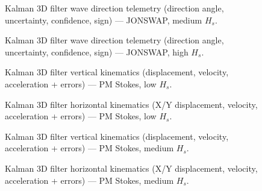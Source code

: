 \documentclass[11pt,letterpaper]{article}
\begin{document}
    \begin{figure}[H]\centering
    \resizebox{\textwidth}{!}{}
    \caption{Kalman 3D filter wave direction telemetry (direction angle, uncertainty, confidence, sign) — JONSWAP, medium $H_s$.}
    \label{fig:w3d_ou2_jonswap_medium_dir}
    \end{figure}

    \begin{figure}[H]\centering
    \resizebox{\textwidth}{!}{}
    \caption{Kalman 3D filter wave direction telemetry (direction angle, uncertainty, confidence, sign) — JONSWAP, high $H_s$.}
    \label{fig:w3d_ou2_jonswap_high_dir}
    \end{figure}




    \begin{figure}[H]\centering
    \resizebox{\textwidth}{!}{}
    \caption{Kalman 3D filter vertical kinematics (displacement, velocity, acceleration + errors) — PM Stokes, low $H_s$.}
    \label{fig:w3d_ou2_pmstokes_low_zkin}
    \end{figure}

    \begin{figure}[H]\centering
    \resizebox{\textwidth}{!}{}
    \caption{Kalman 3D filter horizontal kinematics (X/Y displacement, velocity, acceleration + errors) — PM Stokes, low $H_s$.}
    \label{fig:w3d_ou2_pmstokes_low_xykin}
    \end{figure}

    \begin{figure}[H]\centering
    \resizebox{\textwidth}{!}{}
    \caption{Kalman 3D filter vertical kinematics (displacement, velocity, acceleration + errors) — PM Stokes, medium $H_s$.}
    \label{fig:w3d_ou2_pmstokes_medium_zkin}
    \end{figure}

    \begin{figure}[H]\centering
    \resizebox{\textwidth}{!}{}
    \caption{Kalman 3D filter horizontal kinematics (X/Y displacement, velocity, acceleration + errors) — PM Stokes, medium $H_s$.}
    \label{fig:w3d_ou2_pmstokes_medium_xykin}
    \end{figure}
\end{document}
